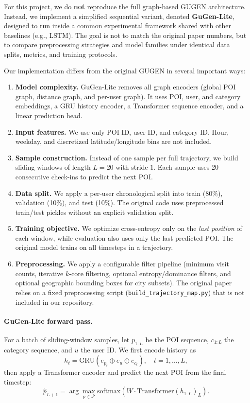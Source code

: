 \documentclass[12pt, journal]{IEEEtran}
\begin{document}
For this project, we do \textbf{not} reproduce the full graph-based GUGEN architecture. Instead, we implement a simplified sequential variant, denoted \textbf{GuGen-Lite}, designed to run inside a common experimental framework shared with other baselines (e.g., LSTM). The goal is not to match the original paper numbers, but to compare preprocessing strategies and model families under identical data splits, metrics, and training protocols.

Our implementation differs from the original GUGEN in several important ways:

\begin{enumerate}
    \item \textbf{Model complexity.} GuGen-Lite removes all graph encoders (global POI graph, distance graph, and per-user graph). It uses POI, user, and category embeddings, a GRU history encoder, a Transformer sequence encoder, and a linear prediction head.
    \item \textbf{Input features.} We use only POI ID, user ID, and category ID. Hour, weekday, and discretized latitude/longitude bins are not included.
    \item \textbf{Sample construction.} Instead of one sample per full trajectory, we build sliding windows of length $L=20$ with stride $1$. Each sample uses 20 consecutive check-ins to predict the next POI.
    \item \textbf{Data split.} We apply a per-user chronological split into train (80\%), validation (10\%), and test (10\%). The original code uses preprocessed train/test pickles without an explicit validation split.
    \item \textbf{Training objective.} We optimize cross-entropy only on the \emph{last position} of each window, while evaluation also uses only the last predicted POI. The original model trains on all timesteps in a trajectory.
    \item \textbf{Preprocessing.} We apply a configurable filter pipeline (minimum visit counts, iterative $k$-core filtering, optional entropy/dominance filters, and optional geographic bounding boxes for city subsets). The original paper relies on a fixed preprocessing script (\texttt{build\_trajectory\_map.py}) that is not included in our repository.
\end{enumerate}

\paragraph{GuGen-Lite forward pass.}
For a batch of sliding-window samples, let $p_{1:L}$ be the POI sequence, $c_{1:L}$ the category sequence, and $u$ the user ID. We first encode history as
\begin{equation}
    h_t = \mathrm{GRU}\!\left(
    e_{p_t} \oplus e_u \oplus e_{c_t}
    \right), \quad t = 1,\ldots,L,
\end{equation}
then apply a Transformer encoder and predict the next POI from the final timestep:
\begin{equation}
    \hat{p}_{L+1} =
    \arg\max_{p \in \mathcal{P}}
    \mathrm{softmax}\!\left(
    W \cdot \mathrm{Transformer}(h_{1:L})_L
    \right).
\end{equation}
\end{document}

